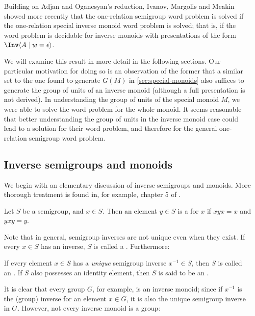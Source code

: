 \documentclass[noindex,noinsetproof,emphthm,12pt]{lmaths}
\begin{document}
Building on Adjan and Oganesyan's reduction, Ivanov, Margolis and Meakin \cite{Ivanov2001} showed more recently that the one-relation semigroup word problem is solved if the one-relation special inverse monoid word problem is solved; that is, if the word problem is decidable for inverse monoids with presentations of the form $\Inv \langle A \mid w = \epsilon\rangle$. 

We will examine this result in more detail in the following sections. Our particular motivation for doing so is an observation of the former that a similar set to the one found to generate $G(M)$ in \cref{sec:special-monoids} also suffices to generate the group of units of an inverse monoid (although a full presentation is not derived). In understanding the group of units of the special monoid $M$, we were able to solve the word problem for the whole monoid. It seems reasonable that better understanding the group of units in the inverse monoid case could lead to a solution for their word problem, and therefore for the general one-relation semigroup word problem.

\subsection{Inverse semigroups and monoids}

We begin with an elementary discussion of inverse semigroups and monoids. More thorough treatment is found in, for example, chapter 5 of \cite{Howie1995}.

\begin{defn}
	Let $S$ be a semigroup, and $x \in S$. Then an element $y \in S$ is a  for $x$ if $xyx = x$ and $yxy = y$.
\end{defn}

Note that in general, semigroup inverses are not unique even when they exist. If every $x \in S$ has an inverse, $S$ is called a . Furthermore:

\begin{defn}
	If every element $x \in S$ has a \emph{unique} semigroup inverse $x^{-1} \in S$, then $S$ is called an . If $S$ also possesses an identity element, then $S$ is said to be an .
\end{defn}

It is clear that every group $G$, for example, is an inverse monoid; since if $x^{-1}$ is the (group) inverse for an element $x \in G$, it is also the unique semigroup inverse in $G$. However, not every inverse monoid is a group:
\end{document}
